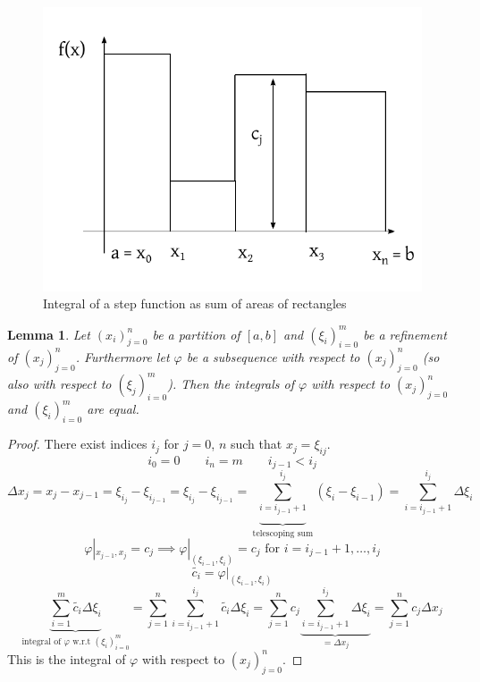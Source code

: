 \documentclass{article}
\newtheorem{lemma}{Lemma}  \numberwithin{lemma}{section}
\begin{document}
\begin{figure}[!h]
  \begin{center}
    \includegraphics{img/12_integral_of_a_step_function.pdf} %
    \caption{Integral of a step function as sum of areas of rectangles}
  \end{center}
\end{figure}

\begin{lemma} %
  \label{lemma2}
  Let $(x_i)_{j=0}^n$ be a partition of $[a,b]$ and $(\xi_i)_{i=0}^m$ be a refinement of $(x_j)_{j=0}^n$.
  Furthermore let $\varphi$ be a subsequence with respect to $(x_j)_{j=0}^n$ (so also with respect to $(\xi_j)_{i=0}^m$).
  Then the integrals of $\varphi$ with respect to $(x_j)_{j=0}^n$ and $(\xi_i)_{i=0}^m$ are equal.
\end{lemma}

\begin{proof}
  There exist indices $i_j$ for $j=0$, $n$ such that $x_j = \xi_{ij}$.
  \[ i_0 = 0 \qquad i_n = m \qquad i_{j-1} < i_j \]
  \[ \Delta x_j = x_j - x_{j-1} = \xi_{i_j} - \xi_{i_{j-1}} = \xi_{i_j} - \xi_{i_{j-1}} = \underbrace{\sum_{i=i_{j-1}+1}^{i_j}}_{\text{telescoping sum}} (\xi_i - \xi_{i-1}) = \sum_{i=i_{j-1}+1}^{i_j} \Delta \xi_i \]
  \[ \varphi|_{x_{j-1},x_j} = c_j \implies \varphi|_{(\xi_{i-1},\xi_i)} = c_j \text{ for } i = i_{j-1}+1, \dots, i_j \]
  \[ \tilde{c_i} = \varphi|_{(\xi_{i-1},\xi_i)} \]
  \[ \underbrace{\sum_{i=1}^m \tilde{c_i} \Delta \xi_i}_{\text{integral of $\varphi$ w.r.t $(\xi_i)_{i=0}^m$}} = \sum_{j=1}^n \sum_{i=i_{j-1}+1}^{i_j} \tilde{c_i} \Delta \xi_i = \sum_{j=1}^n c_j \underbrace{\sum_{i=i_{j-1}+1}^{i_j} \Delta \xi_i}_{= \Delta x_j} = \sum_{j=1}^n c_j \Delta x_j \]
  This is the integral of $\varphi$ with respect to $(x_j)_{j=0}^n$.
\end{proof}
\end{document}
